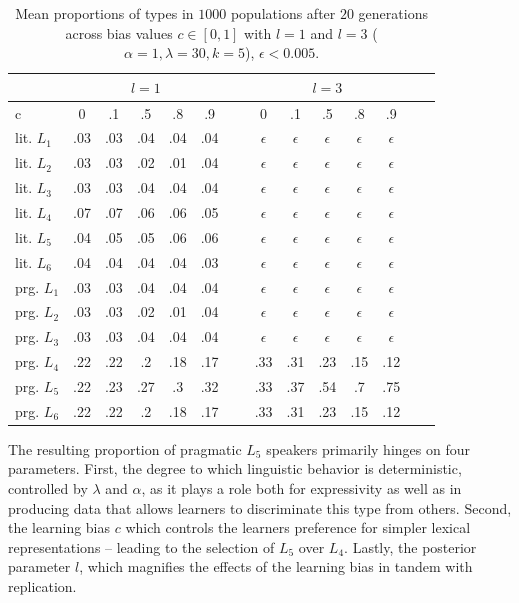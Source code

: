 \documentclass[a4paper]{article}
\begin{document}
\begin{table}
\centering 
\begin{tabular}{l | c c c c c| c c c c c c c c}
\multicolumn{1}{c}{~} & \multicolumn{5}{c}{$l = 1$} & ~ & \multicolumn{5}{c}{$l = 3$}\\ \hline \hline
  c        &  0  & .1  & .5  & .8  & .9 & ~ & 0 & .1 & .5 & .8 & .9\\ \hline \hline
lit. $L_1$ & .03 & .03 & .04 & .04 & .04& ~ & $\epsilon$ & $\epsilon$ & $\epsilon$ & $\epsilon$ & $\epsilon$\\ 
lit. $L_2$ & .03 & .03 & .02 & .01 & .04& ~ & $\epsilon$& $\epsilon$ & $\epsilon$ & $\epsilon$ & $\epsilon$\\
lit. $L_3$ & .03 & .03 & .04 & .04 & .04& ~ & $\epsilon$& $\epsilon$ & $\epsilon$ & $\epsilon$ & $\epsilon$\\
lit. $L_4$ & .07 & .07 & .06 & .06 & .05& ~ & $\epsilon$& $\epsilon$ & $\epsilon$ & $\epsilon$ & $\epsilon$\\
lit. $L_5$ & .04 & .05 & .05 & .06 & .06& ~ & $\epsilon$& $\epsilon$ & $\epsilon$ & $\epsilon$ & $\epsilon$\\
lit. $L_6$ & .04 & .04 & .04 & .04 & .03& ~ & $\epsilon$& $\epsilon$ & $\epsilon$ & $\epsilon$ & $\epsilon$\\ \hline
prg. $L_1$ & .03 & .03 & .04 & .04 & .04& ~ & $\epsilon$& $\epsilon$ & $\epsilon$ & $\epsilon$ & $\epsilon$ \\
prg. $L_2$ & .03 & .03 & .02 & .01 & .04& ~ & $\epsilon$& $\epsilon$ & $\epsilon$ & $\epsilon$ & $\epsilon$ \\
prg. $L_3$ & .03 & .03 & .04 & .04 & .04& ~ & $\epsilon$& $\epsilon$ & $\epsilon$ & $\epsilon$ & $\epsilon$ \\ 
prg. $L_4$ & .22 & .22 & .2 & .18 & .17& ~ & .33& .31 & .23 & .15 & .12 \\
prg. $L_5$ & .22 & .23 & .27 & .3  & .32& ~ & .33& .37 & .54 & .7 & .75 \\
prg. $L_6$ & .22 & .22 & .2 & .18 & .17& ~ & .33& .31 & .23 & .15 & .12
\end{tabular}
\caption{Mean proportions of types in $1000$ populations after $20$ generations across bias values $c \in [0,1]$ with $l =1$ and $l = 3$ ($\alpha = 1, \lambda = 30, k = 5$), $\epsilon < 0.005$.}
\label{tab:numeric-results}
\end{table}

The resulting proportion of pragmatic $L_5$ speakers primarily hinges on four parameters. First, the degree to which linguistic behavior is deterministic, controlled by $\lambda$ and $\alpha$, as it plays a role both for expressivity as well as in producing data that allows learners to discriminate this type from others. Second,  the learning bias $c$ which controls the learners preference for simpler lexical representations -- leading to the selection of $L_5$ over $L_4$. Lastly, the posterior parameter $l$, which magnifies the effects of the learning bias in tandem with replication. 
\end{document}
